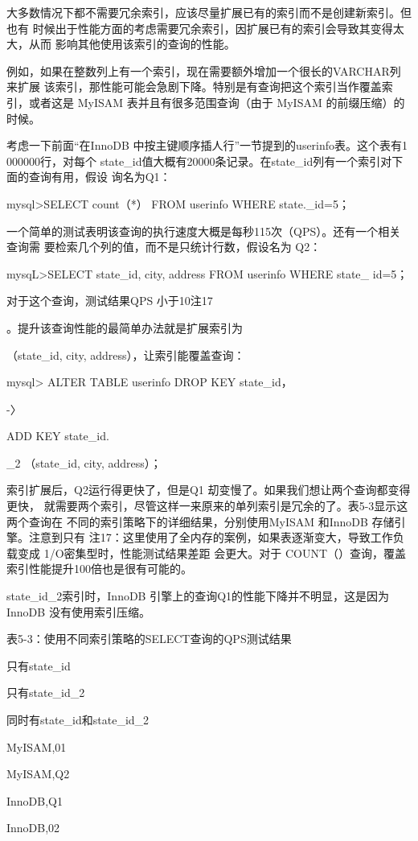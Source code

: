 大多数情况下都不需要冗余索引，应该尽量扩展已有的索引而不是创建新索引。但也有
时候出于性能方面的考虑需要冗余索引，因扩展已有的索引会导致其变得太大，从而
影响其他使用该索引的查询的性能。

例如，如果在整数列上有一个索引，现在需要额外增加一个很长的VARCHAR列来扩展
该索引，那性能可能会急剧下降。特别是有查询把这个索引当作覆盖索引，或者这是
MyISAM 表并且有很多范围查询（由于 MyISAM 的前缀压缩）的时候。

考虑一下前面“在InnoDB 中按主键顺序插人行”一节提到的userinfo表。这个表有1
000000行，对每个 state\_id值大概有20000条记录。在state\_id列有一个索引对下
面的查询有用，假设 询名为Q1：

mysql>SELECT count（*） FROM userinfo WHERE state.\_id=5；

一个简单的测试表明该查询的执行速度大概是每秒115次（QPS）。还有一个相关查询需
要检索几个列的值，而不是只统计行数，假设名为 Q2：

mysqL>SELECT state\_id, city, address FROM userinfo WHERE state\_ id=5；

对于这个查询，测试结果QPS 小于10注17

。提升该查询性能的最简单办法就是扩展索引为

（state\_id, city, address），让索引能覆盖查询：

mysql> ALTER TABLE userinfo DROP KEY state\_id，

-〉

ADD KEY state\_id.

\_2 （state\_id, city, address）；

索引扩展后，Q2运行得更快了，但是Q1 刧变慢了。如果我们想让两个查询都变得更快，
就需要两个索引，尽管这样一来原来的单列索引是冗余的了。表5-3显示这两个查询在
不同的索引策略下的详细结果，分别使用MyISAM 和InnoDB 存储引擎。注意到只有
注17：这里使用了全内存的案例，如果表逐渐变大，导致工作负载变成 1/O密集型时，性能测试结果差距
会更大。对于 COUNT（）查询，覆盖索引性能提升100倍也是很有可能的。

state\_id\_2索引时，InnoDB 引擎上的查询Q1的性能下降并不明显，这是因为InnoDB
没有使用索引压缩。

表5-3：使用不同索引策略的SELECT查询的QPS测试结果

只有state\_id

只有state\_id\_2

同时有state\_id和state\_id\_2

MyISAM,01

MyISAM,Q2

InnoDB,Q1

InnoDB,02

